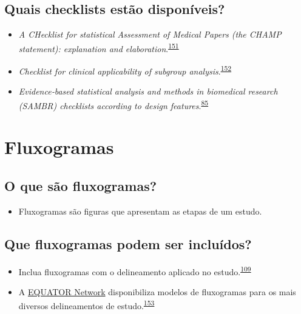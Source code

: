 \documentclass[
]{book}
\providecommand{\tightlist}{%
  \setlength{\itemsep}{0pt}\setlength{\parskip}{0pt}}
\begin{document}
\hypertarget{quais-checklists-estuxe3o-disponuxedveis}{%
\subsection{Quais checklists estão disponíveis?}\label{quais-checklists-estuxe3o-disponuxedveis}}

\begin{itemize}
\item
  \emph{A CHecklist for statistical Assessment of Medical Papers (the CHAMP statement): explanation and elaboration}.\textsuperscript{\protect\hyperlink{ref-Mansournia2021}{151}}
\item
  \emph{Checklist for clinical applicability of subgroup analysis}.\textsuperscript{\protect\hyperlink{ref-Gil-Sierra2020}{152}}
\item
  \emph{Evidence‐based statistical analysis and methods in biomedical research (SAMBR) checklists according to design features}.\textsuperscript{\protect\hyperlink{ref-dwivedi2019}{85}}
\end{itemize}

\hypertarget{fluxogramas}{%
\section{Fluxogramas}\label{fluxogramas}}

\hypertarget{o-que-suxe3o-fluxogramas}{%
\subsection{O que são fluxogramas?}\label{o-que-suxe3o-fluxogramas}}

\begin{itemize}
\tightlist
\item
  Fluxogramas são figuras que apresentam as etapas de um estudo.
\end{itemize}

\hypertarget{que-fluxogramas-podem-ser-incluuxeddos}{%
\subsection{Que fluxogramas podem ser incluídos?}\label{que-fluxogramas-podem-ser-incluuxeddos}}

\begin{itemize}
\item
  Inclua fluxogramas com o delineamento aplicado no estudo.\textsuperscript{\protect\hyperlink{ref-Weissgerber2019}{109}}
\item
  A \href{https://www.equator-network.org}{EQUATOR Network} disponibiliza modelos de fluxogramas para os mais diversos delineamentos de estudo.\textsuperscript{\protect\hyperlink{ref-Altman2008}{153}}
\end{itemize}
\end{document}
